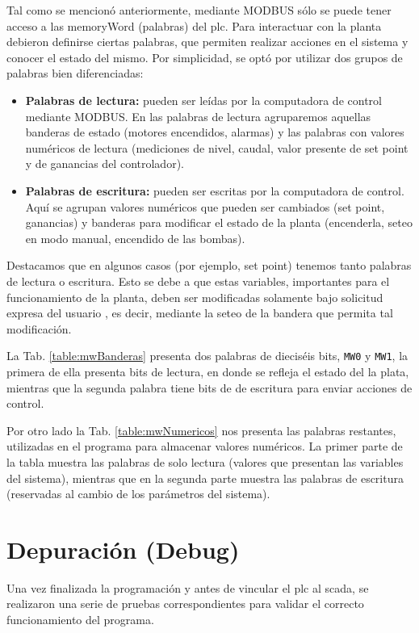 Tal como se mencionó anteriormente, mediante MODBUS sólo se puede tener acceso 
a las \gls{memoryWord} (palabras) del \gls{plc}.
Para interactuar con la planta debieron definirse ciertas palabras, que
permiten realizar acciones en el sistema y conocer el estado del mismo.
Por simplicidad, se optó por utilizar dos grupos de palabras bien
diferenciadas:
\begin{itemize}
 \item \textbf{Palabras de lectura:} pueden ser leídas por la computadora de
control mediante MODBUS. En las palabras de lectura agruparemos aquellas
banderas de estado (motores encendidos, alarmas) y las palabras con valores
numéricos de lectura (mediciones de nivel, caudal, valor presente de set point
y de ganancias del controlador).
 \item \textbf{Palabras de escritura:} pueden ser escritas por la computadora
de control. Aquí se agrupan valores numéricos que pueden ser cambiados (set
point, ganancias) y banderas para modificar el estado de la planta (encenderla,
seteo en modo manual, encendido de las bombas).
\end{itemize}

Destacamos que en algunos casos (por ejemplo, set point) tenemos tanto palabras
de lectura o escritura.
Esto se debe a que estas variables, importantes para el funcionamiento de la
planta, deben ser modificadas solamente bajo solicitud expresa del usuario
, es decir, mediante la seteo de la bandera que permita tal modificación.

La Tab. \ref{table:mwBanderas} presenta dos palabras de dieciséis
bits, \verb|MW0| y \verb|MW1|, la primera de ella presenta bits de lectura, en
donde se
refleja el estado del la plata, mientras que la segunda palabra tiene bits de
de escritura para enviar acciones de control.

Por otro lado la Tab. \ref{table:mwNumericos} nos presenta
las palabras restantes, utilizadas en el programa para
almacenar valores numéricos.
La primer parte de la tabla muestra las palabras de solo lectura (valores que
presentan las variables del sistema), mientras que en la
segunda parte muestra las palabras de escritura (reservadas al cambio
de los parámetros del sistema).

\section{Depuración (Debug)}
\label{sec:Debug}

Una vez finalizada la programación y antes de vincular el \gls{plc}
al \gls{scada}, se realizaron una serie de pruebas correspondientes para
validar el correcto funcionamiento del programa.

